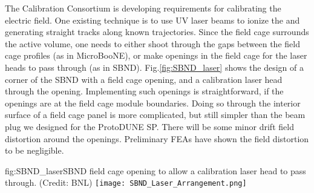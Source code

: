 The Calibration Consortium is developing requirements for calibrating the  electric field.  One existing technique is to use UV laser beams to ionize the  and generating straight tracks along known trajectories.  Since the field cage surrounds the  active volume, one needs to either shoot through the gaps between the field cage profiles (as in MicroBooNE), or make openings in the field cage for the laser heads to pass through (as in SBND).    Fig.\ref{fig:SBND_laser}  shows the design of a corner of the SBND  with a field cage opening, and a calibration laser head through the opening.  Implementing such openings is straightforward, if the openings are at the field cage module boundaries.  Doing so through the interior surface of a field cage panel is more complicated, but still simpler than the beam plug we designed for the ProtoDUNE SP.  There will be some minor drift field distortion around the openings.  Preliminary FEAs have shown the field distortion to be negligible. 

\begin{dunefigure}{fig:SBND_laser}{SBND field cage opening to allow a calibration laser head to pass through. (Credit: BNL)}
\texttt{[image: SBND\_Laser\_Arrangement.png]}
\end{dunefigure}






